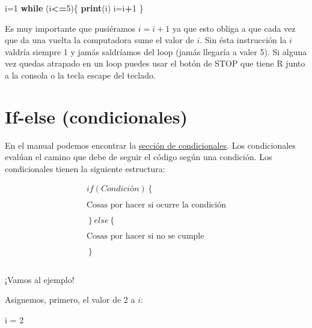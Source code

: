 \documentclass[
]{book}
\newenvironment{Shaded}{\begin{snugshade}}{\end{snugshade}}
\newcommand{\ControlFlowTok}[1]{\textcolor[rgb]{0.13,0.29,0.53}{\textbf{#1}}}
\newcommand{\DecValTok}[1]{\textcolor[rgb]{0.00,0.00,0.81}{#1}}
\newcommand{\KeywordTok}[1]{\textcolor[rgb]{0.13,0.29,0.53}{\textbf{#1}}}
\newcommand{\NormalTok}[1]{#1}
\newcommand{\OperatorTok}[1]{\textcolor[rgb]{0.81,0.36,0.00}{\textbf{#1}}}
\newcommand{\StringTok}[1]{\textcolor[rgb]{0.31,0.60,0.02}{#1}}
\newenvironment{Importante}
{\begin{mdframed}[
  linecolor=importantecolor,
  skipabove=12pt,
  skipbelow=12pt,
  roundcorner=20pt,
  splittopskip=2\topsep]}
{\end{mdframed}}
\begin{document}
\begin{Shaded}
\begin{Highlighting}[]
\NormalTok{i=}\DecValTok{1}
\ControlFlowTok{while}\NormalTok{ (i}\OperatorTok{<=}\DecValTok{5}\NormalTok{)\{}
\KeywordTok{print}\NormalTok{(i)}
\NormalTok{i=i}\OperatorTok{+}\DecValTok{1}
\NormalTok{\}}
\end{Highlighting}
\end{Shaded}

\begin{Importante}
Es muy importante que pusiéramos \(i = i + 1\) ya que esto obliga a que
cada vez que da una vuelta la computadora sume el valor de \(i\). Sin
ésta instrucción la \(i\) valdría siempre 1 y jamás saldríamos del loop
(jamás llegaría a valer 5). Si alguna vez quedas atrapado en un loop
puedes usar el botón de STOP que tiene R junto a la consola o la tecla
escape del teclado.
\end{Importante}

\hypertarget{if-else-condicionales}{%
\section{If-else (condicionales)}\label{if-else-condicionales}}

En el manual podemos encontrar la \href{http://cran.r-project.org/doc/manuals/R-lang.html\#if}{sección de condicionales}. Los condicionales evalúan el camino que debe de seguir el código según una condición. Los condicionales tienen la siguiente estructura:

\[
\begin{align*}
if  (Condición)  \left \{  \right. \\ \\ \text{Cosas por hacer si ocurre la condición}  \\ \\ \left.  \right \} else \left \{ \right. \\ \\ \text{Cosas por hacer si no se cumple} \\ \\ \left. \right \} \\ \\
\end{align*}
\]

¡Vamos al ejemplo!

Asignemos, primero, el valor de 2 a \(i\):

\begin{Shaded}
\begin{Highlighting}[]
\NormalTok{i =}\StringTok{ }\DecValTok{2}
\end{Highlighting}
\end{Shaded}
\end{document}
